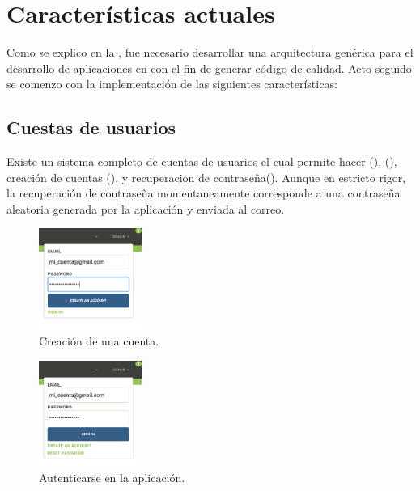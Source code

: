 \section{Características actuales}

Como se explico en la , fue necesario desarrollar una arquitectura genérica para el desarrollo de aplicaciones en \meteorNAME con el fin de generar código de calidad. Acto seguido se comenzo con la implementación de las siguientes características:

\subsection{Cuestas de usuarios}
 
Existe un sistema completo de cuentas de usuarios el cual permite hacer \loginCPT(), \logoutCPT(), creación de cuentas (), y recuperacion de contraseña(). Aunque en estricto rigor, la recuperación de contraseña momentaneamente corresponde a una contraseña aleatoria generada por la aplicación y enviada al correo.


\begin{figure}[H]
	\centering
	\includegraphics[width=0.3\textwidth]{figuras/accounts/create_account.png}

	\caption{Creación de una cuenta.}
	\label{figure:account:create_account}
\end{figure}

\begin{figure}[H]
	\centering
	\includegraphics[width=0.3\textwidth]{figuras/accounts/sign_in_ui.png}

	\caption{Autenticarse en la aplicación.}
	\label{figure:account:sign_in_ui}
\end{figure}


